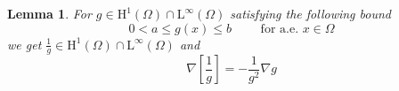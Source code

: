 \documentclass[preprint, 12pt]{amsart}
\numberwithin{equation}{section}
\newtheorem{lemma}[theorem]{Lemma}
\newtheorem{remark}[theorem]{Remark}        %
\numberwithin{equation}{section}
\newcommand{\eps}{\varepsilon}
\DeclareMathOperator{\dv}{div}
\begin{document}
\begin{lemma}\label{lemma: quotient}
For $g \in \mathrm H^1(\Omega) \cap \mathrm L^{\infty}(\Omega)$ satisfying the following bound
\[
0 < a \leq g(x) \leq b \qquad \text{ for a.e. } x \in \Omega
\]
we get $\frac{1}{g} \in \mathrm H^1(\Omega) \cap \mathrm L^{\infty}(\Omega) $ and 
\[
\nabla \left[\frac{1}{g}\right] = - \frac{1}{g^2} \nabla g
\]
\end{lemma}




\begin{singlespace}

\end{singlespace}



\end{document}
